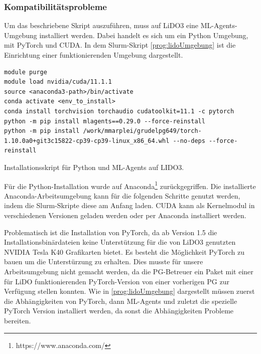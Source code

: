 \subsubsection{Kompatibilitätsprobleme}
Um das beschriebene Skript auszuführen, muss auf LiDO3 eine ML-Agents-Umgebung installiert werden. Dabei handelt es sich um ein Python Umgebung, mit PyTorch und CUDA. In dem Slurm-Skript \ref{prog:lidoUmgebung} ist die Einrichtung einer funktionierenden Umgebung dargestellt. 

\begin{listing}
	\begin{verbatim}
module purge
module load nvidia/cuda/11.1.1
source <anaconda3-path>/bin/activate
conda activate <env_to_install>
conda install torchvision torchaudio cudatoolkit=11.1 -c pytorch
python -m pip install mlagents==0.29.0 --force-reinstall
python -m pip install /work/mmarplei/grudelpg649/torch-1.10.0a0+git3c15822-cp39-cp39-linux_x86_64.whl --no-deps --force-reinstall 
	\end{verbatim}
	\caption{Installationsskript für Python und ML-Agents auf LIDO3.}
	\label{prog:lidoUmgebung}
\end{listing}

Für die Python-Installation wurde auf Anaconda\footnote{https://www.anaconda.com/} zurückgegriffen. Die installierte Anaconda-Arbeitsumgebung kann für die folgenden Schritte genutzt werden, indem die Slurm-Skripte diese am Anfang laden. CUDA kann als Kernelmodul in verschiedenen Versionen geladen werden oder per Anaconda installiert werden.

Problematisch ist die Installation von PyTorch, da ab Version 1.5 die Installationsbinärdateien keine Unterstützung für die von LiDO3 genutzten NVIDIA Tesla K40 Grafikarten bietet. Es besteht die Möglichkeit PyTorch zu bauen um die Unterstürzung zu erhalten. Dies musste für unsere Arbeitsumgebung nicht gemacht werden, da die PG-Betreuer ein Paket mit einer für LiDO funktionierenden PyTorch-Version von einer vorherigen PG zur Verfügung stellen konnten. Wie in \ref{prog:lidoUmgebung} dargestellt müssen zuerst die Abhängigkeiten von PyTorch, dann ML-Agents und zuletzt die spezielle PyTorch Version installiert werden, da sonst die Abhängigkeiten Probleme bereiten.

